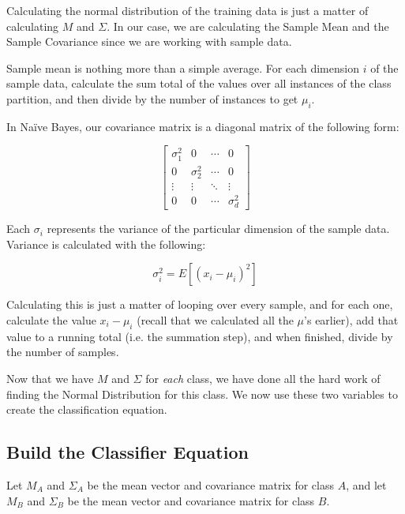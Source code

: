 \documentclass{article}
\begin{document}
Calculating the normal distribution of the training data is just a
matter of calculating $M$ and $\Sigma$.  In our case, we are
calculating the Sample Mean and the Sample Covariance
\cite{wiki_covariance} since we are working with sample data.

Sample mean is nothing more than a simple average.  For each dimension
$i$ of the sample data, calculate the sum total of the values over all
instances of the class partition, and then divide by the number of
instances to get $\mu_i$.

In Na\"ive Bayes, our covariance matrix is a diagonal matrix of the
following form:

\begin{displaymath}
\begin{bmatrix} \sigma^2_1 & 0 & \cdots & 0 \\
				 0 & \sigma^2_2 & \cdots & 0 \\
				 \vdots & \vdots & \ddots & \vdots \\
				 0 & 0 & \cdots & \sigma^2_d
\end{bmatrix}
\end{displaymath}

Each $\sigma_i$ represents the variance of the particular dimension of
the sample data.  Variance is calculated with the following:

\begin{displaymath}
 \sigma^2_i = E [{(x_i - \mu_i)}^2]
\end{displaymath}

Calculating this is just a matter of looping over every sample, and
for each one, calculate the value $x_i - \mu_i$ (recall that we
calculated all the $\mu$'s earlier), add that value to a running total
(i.e. the summation step), and when finished, divide by the number of
samples.

Now that we have $M$ and $\Sigma$ for \emph{each} class, we have done
all the hard work of finding the Normal Distribution for this class.
We now use these two variables to create the classification equation.

\subsection{Build the Classifier Equation}

Let $M_A$ and $\Sigma_A$ be the mean vector and covariance matrix for
class $A$, and let $M_B$ and $\Sigma_B$ be the mean vector and
covariance matrix for class $B$.
\end{document}
